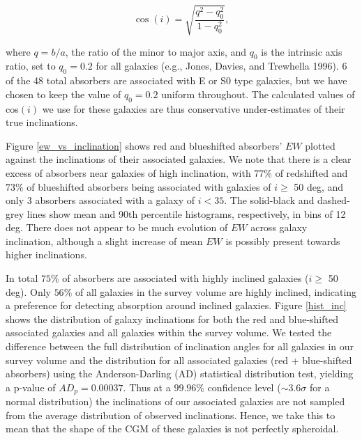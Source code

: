 \documentclass[twocolumn,tighten]{aastex6}
\begin{document}
\begin{equation}
	\cos(i) = \sqrt{\frac{q^2 - q_0^2}{1 - q_0^2}},
	\label{incEq}
\end{equation}

\noindent where $q = b/a$, the ratio of the minor to major axis, and $q_0$ is the intrinsic axis ratio, set to $q_0 = 0.2$ for all galaxies (e.g., Jones, Davies, and Trewhella 1996). 6 of the 48 total absorbers are associated with E or S0 type galaxies, but we have chosen to keep the value of $q_0 = 0.2$ uniform throughout. The calculated values of cos$(i)$ we use for these galaxies are thus conservative under-estimates of their true inclinations.

Figure \ref{ew_vs_inclination} shows red and blueshifted absorbers' $EW$ plotted against the inclinations of their associated galaxies. We note that there is a clear excess of absorbers near galaxies of high inclination, with $77\%$ of redshifted and $73\%$ of blueshifted absorbers being associated with galaxies of $i \geq$ 50 deg, and only 3 absorbers associated with a galaxy of $i<35$. The solid-black and dashed-grey lines show mean and 90th percentile histograms, respectively, in bins of 12 deg. There does not appear to be much evolution of $EW$ across galaxy inclination, although a slight increase of mean $EW$ is possibly present towards higher inclinations.

In total $75\%$ of absorbers are associated with highly inclined galaxies ($i \geq$ 50 deg). Only $56\%$ of all galaxies in the survey volume are highly inclined, indicating a preference for detecting absorption around inclined galaxies. Figure \ref{hist_inc} shows the distribution of galaxy inclinations for both the red and blue-shifted associated galaxies and all galaxies within the survey volume. We tested the difference between the full distribution of inclination angles for all galaxies in our survey volume and the distribution for all associated galaxies (red + blue-shifted absorbers) using the Anderson-Darling (AD) statistical distribution test, yielding a p-value of $AD_{p} = 0.00037$. Thus at a $99.96\%$ confidence level ($\sim 3.6 \sigma$ for a normal distribution) the inclinations of our associated galaxies are not sampled from the average distribution of observed inclinations. Hence, we take this to mean that the shape of the CGM of these galaxies is not perfectly spheroidal. 
\end{document}
